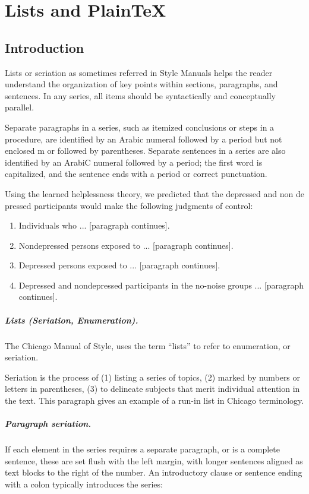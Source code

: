 \chapter{Lists and PlainTeX}

\section{Introduction}

Lists or seriation as sometimes referred in Style Manuals helps the reader understand the organization of key points within sections, paragraphs,
and sentences. In any series, all items should be syntactically and conceptually
parallel.

Separate paragraphs in a series, such as itemized conclusions or steps in a procedure,
are identified by an Arabic numeral followed by a period but not enclosed m or
followed by parentheses. Separate sentences in a series are also identified by an ArabiC
numeral followed by a period; the first word is capitalized, and the sentence ends with
a period or correct punctuation.

Using the learned helplessness theory, we predicted that the depressed and
non de pressed participants would make the following judgments of control:

\begin{enumerate}
  \item Individuals who ... [paragraph continues].
  \item Nondepressed persons exposed to ... [paragraph continues].
  \item Depressed persons exposed to ... [paragraph continues].
  \item Depressed and nondepressed participants in the no-noise groups ... [paragraph continues].
\end{enumerate}

\paragraph{Lists (Seriation, Enumeration).} The Chicago Manual of Style, uses the term \enquote{lists} to refer to enumeration, or seriation.

Seriation is the process of (1) listing a series of topics, (2) marked by numbers or letters in parentheses,
(3) to delineate subjects that merit individual attention in the text. This paragraph gives an example of a
run-in list in Chicago terminology. 

\paragraph{Paragraph seriation.} If each element in the series requires a separate paragraph, or is a complete
sentence, these are set flush with the left margin, with longer sentences aligned as text blocks to the right
of the number. An introductory clause or sentence ending with a colon typically introduces the series:

